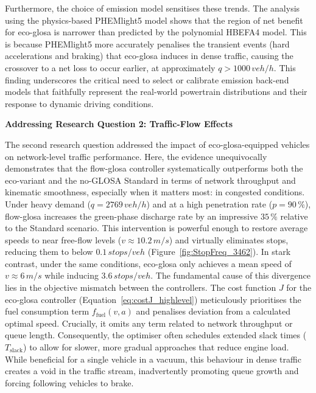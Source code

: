 \mynewline
Furthermore, the choice of emission model sensitises these trends. The analysis using the physics-based PHEMlight5 model shows that the region of net benefit for \ac{eco-glosa} is narrower than predicted by the polynomial HBEFA4 model. This is because PHEMlight5 more accurately penalises the transient events (hard accelerations and braking) that \ac{eco-glosa} induces in dense traffic, causing the crossover to a net loss to occur earlier, at approximately $q > 1000\,\unit{veh/h}$. This finding underscores the critical need to select or calibrate emission back-end models that faithfully represent the real-world powertrain distributions and their response to dynamic driving conditions.

\bigskip
\textbf{Addressing Research Question 2: Traffic-Flow Effects}

The second research question addressed the impact of \ac{eco-glosa}-equipped vehicles on network-level traffic performance. Here, the evidence unequivocally demonstrates that the \ac{flow-glosa} controller systematically outperforms both the eco-variant and the no-GLOSA Standard in terms of network throughput and kinematic smoothness, especially when it matters most: in congested conditions.
\mynewline
Under heavy demand ($q = 2769\,\unit{veh/h}$) and at a high penetration rate ($p=90\,\%$), \ac{flow-glosa} increases the green-phase discharge rate by an impressive $35\,\%$ relative to the Standard scenario. This intervention is powerful enough to restore average speeds to near free-flow levels ($v\approx10.2\,\unit{m/s}$) and virtually eliminates stops, reducing them to below $0.1\,\unit{stops/veh}$ (Figure~\ref{fig:StopFreq_3462}). In stark contrast, under the same conditions, \ac{eco-glosa} only achieves a mean speed of $v\approx6\,\unit{m/s}$ while inducing $3.6\,\unit{stops/veh}$.
\mynewline
The fundamental cause of this divergence lies in the objective mismatch between the controllers. The cost function $J$ for the \ac{eco-glosa} controller (Equation~\ref{eq:costJ_highlevel}) meticulously prioritises the fuel consumption term $f_\mathrm{fuel}(v,a)$ and penalises deviation from a calculated optimal speed. Crucially, it omits any term related to network throughput or queue length. Consequently, the optimiser often schedules extended slack times ($T_\mathrm{slack}$) to allow for slower, more gradual approaches that reduce engine load. While beneficial for a single vehicle in a vacuum, this behaviour in dense traffic creates a void in the traffic stream, inadvertently promoting queue growth and forcing following vehicles to brake.

